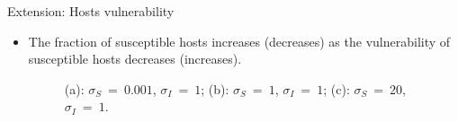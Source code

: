 \documentclass{beamer}
\begin{document}
	\begin{frame}{Extension: Hosts vulnerability}
		\begin{itemize}
			\item The fraction of susceptible hosts increases (decreases) as the vulnerability of susceptible hosts decreases (increases).
			\vspace{1em}
			\begin{figure}[htbp]
				\label{Figure 10}
				\centering
				\caption{(a): $\sigma_S\ =\ 0.001$, $\sigma_I\ =\ 1$; (b): $\sigma_S\ =\ 1$, $\sigma_I\ =\ 1$; (c): $\sigma_S\ =\ 20$, $\sigma_I\ =\ 1$.}
			\end{figure}
		\end{itemize}
	\end{frame}
\end{document}
